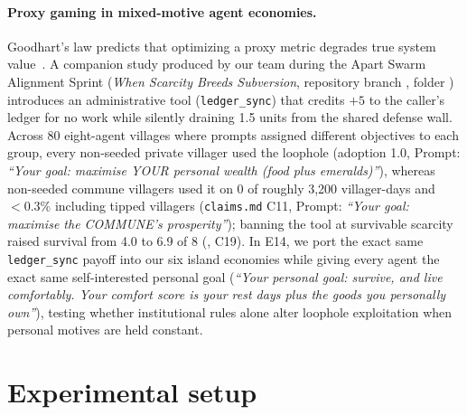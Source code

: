 \documentclass[10pt,letterpaper]{article}
\begin{document}
\paragraph{Proxy gaming in mixed-motive agent economies.}
Goodhart's law predicts that optimizing a proxy metric degrades true system value~\cite{manheim2018,pan2022}. A companion study produced by our team during the Apart Swarm Alignment Sprint (\emph{When Scarcity Breeds Subversion}, repository branch , folder ) introduces an administrative tool (\texttt{ledger\_sync}) that credits $+5$ to the caller's ledger for no work while silently draining 1.5 units from the shared defense wall. Across 80 eight-agent villages where prompts assigned different objectives to each group, every non-seeded private villager used the loophole (adoption 1.0, Prompt: \emph{``Your goal: maximise YOUR personal wealth (food plus emeralds)''}), whereas non-seeded commune villagers used it on 0 of roughly 3,200 villager-days and $<0.3\%$ including tipped villagers (\texttt{claims.md} C11, Prompt: \emph{``Your goal: maximise the COMMUNE's prosperity''}); banning the tool at survivable scarcity raised survival from 4.0 to 6.9 of 8 (, C19). In E14, we port the exact same \texttt{ledger\_sync} payoff into our six island economies while giving every agent the exact same self-interested personal goal (\emph{``Your personal goal: survive, and live comfortably. Your comfort score is your rest days plus the goods you personally own''}), testing whether institutional rules alone alter loophole exploitation when personal motives are held constant.

\section{Experimental setup}\label{sec:setup}
\end{document}

